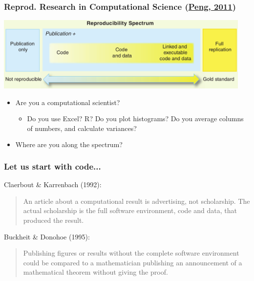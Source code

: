 \documentclass[c]{beamer} %
\begin{document}
\begin{frame}
  \frametitle{Reprod. Research in Computational Science (\href{http://dx.doi.org/10.1126/science.1213847}{Peng, 2011})}
  \begin{center}
    \includegraphics[width=0.95\textwidth,height=0.90\textheight,keepaspectratio=true]{peng_11_reproducible-research_fig1}%
  \end{center}
  \pause
  \begin{itemize}
  \item Are you a computational scientist?
    \pause
    \begin{itemize}
    \item Do you use Excel? R? Do you plot histograms? Do you average columns of numbers, and calculate variances?
    \end{itemize}
    \bigskip
    \pause
  \item Where are you along the spectrum?
  \end{itemize}
\end{frame}

\begin{frame}
  \frametitle{Let us start with code...}
  Claerbout \& Karrenbach (1992):
  \begin{quote}
    An article about a computational result is advertising, not scholarship. The actual scholarship is the full software environment, code and data, that produced the result.
  \end{quote}
  
  \bigskip
  \pause
  
  Buckheit \& Donohoe (1995):
  \begin{quote}
    Publishing figures or results without the complete software environment could be compared to a mathematician publishing an announcement of a mathematical theorem without giving the proof.
  \end{quote}
\end{frame}
\end{document}
